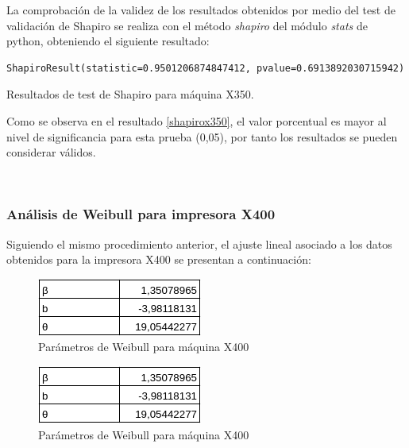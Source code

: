 La comprobación de la validez de los resultados obtenidos por medio del test de validación de Shapiro se realiza con el método \textit{shapiro} del módulo \textit{stats} de python, obteniendo el siguiente resultado:


\begin{table}[H]
\begin{lstlisting}
ShapiroResult(statistic=0.9501206874847412, pvalue=0.6913892030715942)
\end{lstlisting}
\caption{Resultados de test de Shapiro para máquina X350.}
\label{shapirox350}
\end{table}

Como se observa en el resultado \ref{shapirox350}, el valor porcentual es mayor al nivel de significancia para esta prueba (0,05), por tanto los resultados se pueden considerar válidos.

\

\subsubsection{Análisis de Weibull para impresora X400}

Siguiendo el mismo procedimiento anterior, el ajuste lineal asociado a los datos obtenidos para la impresora X400 se presentan a continuación:

\begin{figure}[H]
\centering
\includegraphics[scale=0.9]{images/paramx400.png}
\caption{Parámetros de Weibull para máquina X400}
\label{paramx350}
\end{figure}

\begin{figure}[H]
\centering
\includegraphics[scale=0.9]{images/paramx400.png}
\caption{Parámetros de Weibull para máquina X400}
\label{paramx400}
\end{figure}

